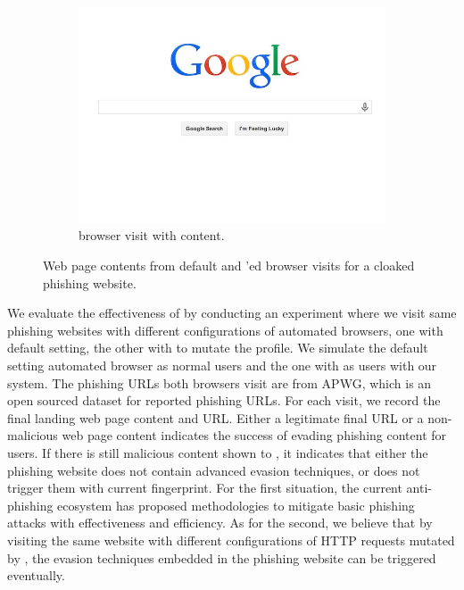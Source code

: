 \begin{figure}
\begin{subfigure}[tb]{.31\textwidth}
		\includegraphics[width=\linewidth]{figs/netflix_sp2.png}
        \caption{\spartacus browser visit with content.}
        \label{fig:sp2}
	\end{subfigure}%
	\quad
	\caption{Web page contents from default and \spartacus'ed browser visits for a cloaked phishing website.}
	\label{fig:effectiveness}
\end{figure}

We evaluate the effectiveness of \spartacus by conducting an experiment where we visit same phishing websites with different configurations of automated browsers, one with default setting, the other with \spartacus to mutate the profile.
We simulate the default setting automated browser as normal users and the one with \spartacus as users with our system.
The phishing URLs both browsers visit are from APWG, which is an open sourced dataset for reported phishing URLs.
For each visit, we record the final landing web page content and URL.
Either a legitimate final URL or a non-malicious web page content indicates the success of \spartacus evading phishing content for users.
If there is still malicious content shown to \spartacus, it indicates that either the phishing website does not contain advanced evasion techniques, or \spartacus does not trigger them with current fingerprint.
For the first situation, the current anti-phishing ecosystem has proposed methodologies to mitigate basic phishing attacks with effectiveness and efficiency.
As for the second, we believe that by visiting the same website with different configurations of HTTP requests mutated by \spartacus, the evasion techniques embedded in the phishing website can be triggered eventually. 


